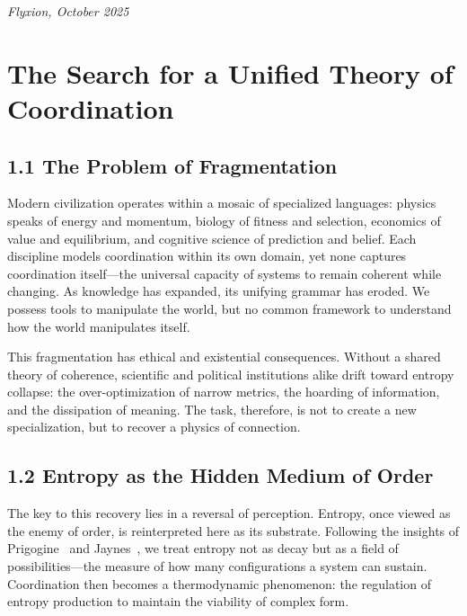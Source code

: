 \documentclass[11pt,a4paper,titlepage]{article}
\theoremstyle{definition}
\begin{document}
\bigskip
\noindent
\textit{Flyxion, October 2025}

\tableofcontents
\newpage

\section{The Search for a Unified Theory of Coordination}
\label{sec:introduction}

\subsection{1.1 The Problem of Fragmentation}

Modern civilization operates within a mosaic of specialized languages:
physics speaks of energy and momentum,  
biology of fitness and selection,  
economics of value and equilibrium,  
and cognitive science of prediction and belief.
Each discipline models coordination within its own domain,  
yet none captures coordination itself---the universal capacity of systems to
remain coherent while changing.
As knowledge has expanded, its unifying grammar has eroded.
We possess tools to manipulate the world,  
but no common framework to understand how the world manipulates itself.

This fragmentation has ethical and existential consequences.
Without a shared theory of coherence,  
scientific and political institutions alike drift toward entropy collapse:
the over-optimization of narrow metrics,  
the hoarding of information,  
and the dissipation of meaning.
The task, therefore, is not to create a new specialization,  
but to recover a physics of connection.

\subsection{1.2 Entropy as the Hidden Medium of Order}

The key to this recovery lies in a reversal of perception.
Entropy, once viewed as the enemy of order,  
is reinterpreted here as its substrate.
Following the insights of Prigogine~\cite{prigogine1984} and Jaynes~\cite{jaynes1957},
we treat entropy not as decay but as a field of possibilities---the measure of
how many configurations a system can sustain.
Coordination then becomes a thermodynamic phenomenon:
the regulation of entropy production to maintain the viability of complex form.
\end{document}
